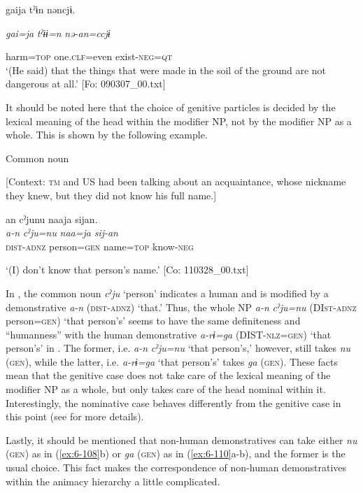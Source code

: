 \begin{table}
      gaija  tˀɨn  nəncjɨ.

      \textit{gai=ja}  \textit{tˀɨɨ=n}  \textit{nə-an=ccjɨ}

      harm=\textsc{top}  one.\textsc{clf}=even  exist-\textsc{neg}=\textsc{qt}\\
\glt ‘(He said) that the things that were made in the soil of the ground are not dangerous at all.’ [Fo: 090307\_00.txt]
\z

It should be noted here that the choice of genitive particles is decided by the lexical meaning of the head within the modifier NP, not by the modifier NP as a whole. This is shown by the following example.

\ea\label{ex:6-109}
  Common noun

  [Context: \textsc{tm} and US had been talking about an acquaintance, whose nickname they knew, but they did not know his full name.]

{\TM}
\glll an  cˀjunu  naaja  sijan.\\
\textit{a-n}  \textit{cˀju=nu}  \textit{naa=ja}  \textit{sij-an}\\

    \textsc{dist}-\textsc{adnz}  person=\textsc{gen}  name=\textsc{top}  know-\textsc{neg}

\glt    ‘(I) don’t know that person’s name.’ [Co: 110328\_00.txt]
\z

In , the common noun \textit{cˀju} ‘person’ indicates a human and is modified by a demonstrative \textit{a-n} (\textsc{dist}-\textsc{adnz}) ‘that.’ Thus, the whole NP \textit{a-n} \textit{cˀju=nu} (DI\textsc{st}-\textsc{adnz} person=\textsc{gen}) ‘that person’s’ seems to have the same definiteness and “humanness” with the human demonstrative \textit{a-rɨ=ga} (DIST-\textsc{nlz}=\textsc{gen}) ‘that person’s’ in . The former, i.e. \textit{a-n} \textit{cˀju=nu} ‘that person’s,’ however, still takes \textit{nu} (\textsc{gen}), while the latter, i.e. \textit{a-rɨ=ga} ‘that person’s’ takes \textit{ga} (\textsc{gen}). These facts mean that the genitive case does not take care of the lexical meaning of the modifier NP as a whole, but only takes care of the head nominal within it. Interestingly, the nominative case behaves differently from the genitive case in this point (see  for more details).

  Lastly, it should be mentioned that non-human demonstratives can take either \textit{nu} (\textsc{gen}) as in (\ref{ex:6-108}b) or \textit{ga} (\textsc{gen}) as in (\ref{ex:6-110}a-b), and the former is the usual choice. This fact makes the correspondence of non-human demonstratives within the animacy hierarchy a little complicated.


\end{table}
